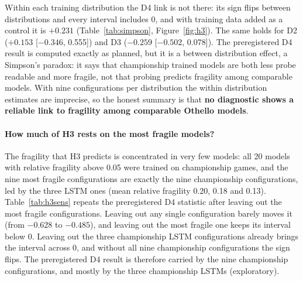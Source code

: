 \documentclass[11pt]{scrartcl}
\begin{document}
Within each training distribution the D4 link is not there: its sign flips between distributions and every
interval includes 0, and with training data added as a control it is $+0.231$ (Table~\ref{tab:simpson},
Figure~\ref{fig:h3}). The same holds for D2 ($+0.153$ [$-0.346$, 0.555]) and D3 ($-0.259$ [$-0.502$, 0.078]).
The preregistered D4 result is computed exactly as planned, but it is a between distribution effect, a
Simpson's paradox: it says that championship trained models are both less probe readable and more fragile,
not that probing predicts fragility among comparable models. With nine configurations per distribution the
within distribution estimates are imprecise, so the honest summary is that \textbf{no diagnostic shows a
reliable link to fragility among comparable Othello models}.

\paragraph{How much of H3 rests on the most fragile models?} The fragility that H3 predicts is concentrated
in very few models: all 20 models with relative fragility above 0.05 were trained on championship games, and
the nine most fragile configurations are exactly the nine championship configurations, led by the three
LSTM ones (mean relative fragility 0.20, 0.18 and 0.13). Table~\ref{tab:h3sens} repeats the preregistered D4
statistic after leaving out the most fragile configurations. Leaving out any single configuration barely moves
it (from $-0.628$ to $-0.485$), and leaving out the most fragile one keeps its interval below 0. Leaving out the
three championship LSTM configurations already brings the interval across 0, and without all nine
championship configurations the sign flips. The preregistered D4 result is therefore carried by the nine
championship configurations, and mostly by the three championship LSTMs (exploratory).
\end{document}
